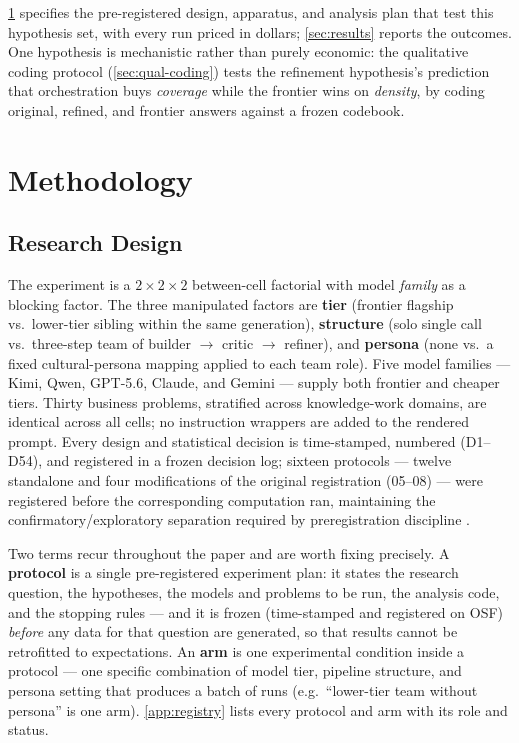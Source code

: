 \documentclass[12pt,a4paper]{article}
\begin{document}
\cref{sec:method} specifies the pre-registered design, apparatus, and analysis
plan that test this hypothesis set, with every run priced in dollars;
\cref{sec:results} reports the outcomes. One hypothesis is mechanistic rather
than purely economic: the qualitative coding protocol (\cref{sec:qual-coding})
tests the refinement hypothesis's prediction that orchestration buys
\emph{coverage} while the frontier wins on \emph{density}, by coding original,
refined, and frontier answers against a frozen codebook.



\section{Methodology}\label{sec:method}

\subsection{Research Design}

The experiment is a $2 \times 2 \times 2$ between-cell factorial with model
\emph{family} as a blocking factor. The three manipulated factors are
\textbf{tier} (frontier flagship vs.\ lower-tier sibling within the same
generation), \textbf{structure} (solo single call vs.\ three-step team of
builder $\to$ critic $\to$ refiner), and \textbf{persona} (none vs.\ a fixed
cultural-persona mapping applied to each team role). Five model families ---
Kimi, Qwen, GPT-5.6, Claude, and Gemini --- supply both frontier and cheaper
tiers. Thirty business problems, stratified across knowledge-work domains,
are identical across all cells; no instruction wrappers are added to the
rendered prompt. Every design and statistical decision is time-stamped, numbered
(D1--D54), and registered in a frozen decision log; sixteen protocols ---
twelve standalone and four modifications of the original registration (05--08)
--- were registered before the corresponding computation ran, maintaining
the confirmatory/exploratory separation required by preregistration discipline
\citep{NosekEtAl2018}.

Two terms recur throughout the paper and are worth fixing precisely. A
\textbf{protocol} is a single pre-registered experiment plan: it states the
research question, the hypotheses, the models and problems to be run, the
analysis code, and the stopping rules --- and it is frozen (time-stamped and
registered on OSF) \emph{before} any data for that question are generated, so
that results cannot be retrofitted to expectations. An \textbf{arm} is one
experimental condition inside a protocol --- one specific combination of model
tier, pipeline structure, and persona setting that produces a batch of runs
(e.g.\ ``lower-tier team without persona'' is one arm). \cref{app:registry}
lists every protocol and arm with its role and status.
\end{document}
